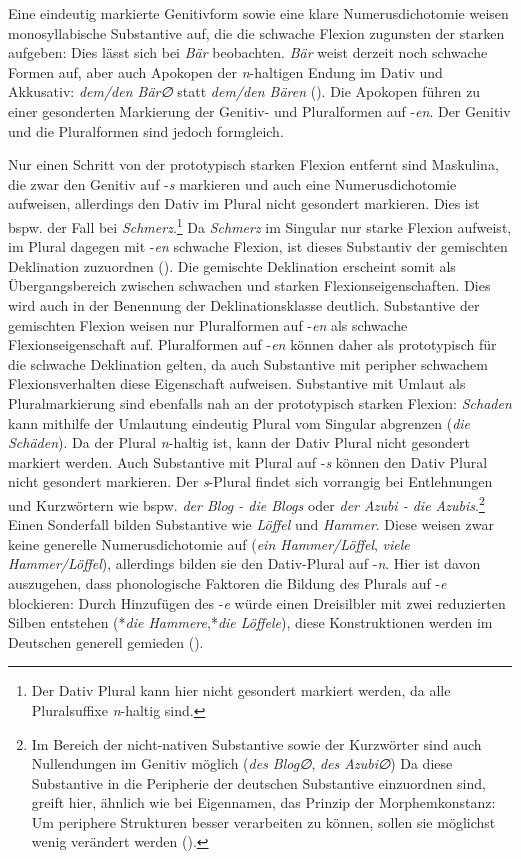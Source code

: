Eine eindeutig markierte Genitivform sowie eine klare Numerusdichotomie weisen monosyllabische Substantive auf, die die schwache Flexion zugunsten der starken aufgeben: Dies lässt sich bei \textit{Bär} beobachten. \textit{Bär} weist derzeit noch schwache Formen auf, aber auch Apokopen der \textit{n}-haltigen Endung im Dativ und Akkusativ: \textit{dem/den Bär∅} statt \textit{dem/den Bären} (\cite[69]{Kopcke.2005}). Die Apokopen führen zu einer gesonderten Markierung der Genitiv- und Pluralformen auf -\textit{en}. Der Genitiv und die Pluralformen sind jedoch formgleich. 

Nur einen Schritt von der prototypisch starken Flexion entfernt sind Maskulina, die zwar den Genitiv auf -\textit{s} markieren und auch eine Numerusdichotomie aufweisen, allerdings den Dativ im Plural nicht gesondert markieren. Dies ist bspw. der Fall bei \textit{Schmerz}.\footnote{Der Dativ Plural kann hier nicht gesondert markiert werden, da alle Pluralsuffixe \textit{n}-haltig sind.} Da \textit{Schmerz} im Singular nur starke Flexion aufweist, im Plural dagegen mit -\textit{en} schwache Flexion, ist dieses Substantiv der gemischten Deklination zuzuordnen (\cite[283]{Nubling.2008}). Die gemischte Deklination erscheint somit als Übergangsbereich zwischen schwachen und starken Flexionseigenschaften. Dies wird auch in der Benennung der Deklinationsklasse deutlich. Substantive der gemischten Flexion weisen nur Pluralformen auf -\textit{en} als schwache Fle\-xionseigenschaft auf. Pluralformen auf -\textit{en} können daher als prototypisch für die schwache Deklination gelten, da auch Substantive mit peripher schwachem Flexionsverhalten diese Eigenschaft aufweisen. 
Substantive mit Umlaut als Pluralmarkierung sind ebenfalls nah an der prototypisch starken Flexion: \textit{Schaden} kann mithilfe der Umlautung eindeutig Plural vom Singular abgrenzen (\textit{die Schäden}). Da der Plural \textit{n}-haltig ist, kann der Dativ Plural nicht gesondert markiert werden. Auch Substantive mit Plural auf -\textit{s} können den Dativ Plural nicht gesondert markieren. Der \textit{s}-Plural findet sich vorrangig bei Entlehnungen und Kurzwörtern wie bspw. \textit{der Blog - die Blogs} oder \textit{der Azubi - die Azubis}.\footnote{Im Bereich der nicht-nativen Substantive sowie der Kurzwörter sind auch Nullendungen im Genitiv möglich (\textit{des Blog∅}, \textit{des Azubi∅}) Da diese Substantive in die Peripherie der deutschen Substantive einzuordnen sind, greift hier, ähnlich wie bei Eigennamen, das Prinzip der Morphemkonstanz: Um periphere Strukturen besser verarbeiten zu können, sollen sie möglichst wenig verändert werden (\cite[151--154]{Ackermann.2017}).} Einen Sonderfall bilden Substantive wie \textit{Löffel} und \textit{Hammer}. Diese weisen zwar keine generelle Numerusdichotomie auf (\textit{ein Hammer/Löffel}, \textit{viele Hammer/Löffel}), allerdings bilden sie den Dativ-Plural auf -\textit{n}. Hier ist davon auszugehen, dass phonologische Faktoren die Bildung des Plurals auf -\textit{e} blockieren: Durch Hinzufügen des -\textit{e} würde einen Dreisilbler mit zwei reduzierten Silben entstehen (*\textit{die Hammere},*\textit{die Löffele}), diese Konstruktionen werden im Deutschen generell gemieden (\cite[47--49]{Eisenberg.1991}).\largerpage

